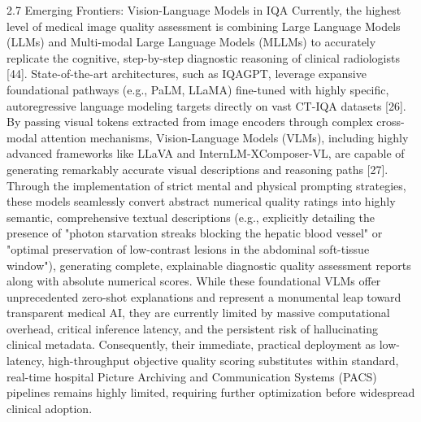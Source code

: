 2.7 Emerging Frontiers: Vision-Language Models in IQA Currently, the highest level of medical image quality assessment is combining Large Language Models (LLMs) and Multi-modal Large Language Models (MLLMs) to accurately replicate the cognitive, step-by-step diagnostic reasoning of clinical radiologists [44]. State-of-the-art architectures, such as IQAGPT, leverage expansive foundational pathways (e.g., PaLM, LLaMA) fine-tuned with highly specific, autoregressive language modeling targets directly on vast CT-IQA datasets [26]. By passing visual tokens extracted from image encoders through complex cross-modal attention mechanisms, Vision-Language Models (VLMs), including highly advanced frameworks like LLaVA and InternLM-XComposer-VL, are capable of generating remarkably accurate visual descriptions and reasoning paths [27]. Through the implementation of strict mental and physical prompting strategies, these models seamlessly convert abstract numerical quality ratings into highly semantic, comprehensive textual descriptions (e.g., explicitly detailing the presence of "photon starvation streaks blocking the hepatic blood vessel" or "optimal preservation of low-contrast lesions in the abdominal soft-tissue window"), generating complete, explainable diagnostic quality assessment reports along with absolute numerical scores. While these foundational VLMs offer unprecedented zero-shot explanations and represent a monumental leap toward transparent medical AI, they are currently limited by massive computational overhead, critical inference latency, and the persistent risk of hallucinating clinical metadata. Consequently, their immediate, practical deployment as low-latency, high-throughput objective quality scoring substitutes within standard, real-time hospital Picture Archiving and Communication Systems (PACS) pipelines remains highly limited, requiring further optimization before widespread clinical adoption.
